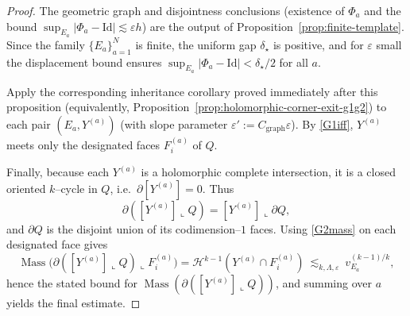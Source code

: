 \documentclass[11pt]{article}
\numberwithin{equation}{section}  %
\theoremstyle{plain}
\theoremstyle{definition}
\theoremstyle{remark}
\DeclareMathOperator{\Mass}{Mass}
\begin{document}
\begin{proof}

The geometric graph and disjointness conclusions (existence of $\Phi_a$ and the bound $\sup_{E_a}|\Phi_a-\mathrm{Id}|\lesssim \varepsilon h$)
are the output of Proposition~\ref{prop:finite-template}.
Since the family $\{E_a\}_{a=1}^N$ is finite, the uniform gap $\delta_\star$ is positive, and for $\varepsilon$ small the displacement bound
ensures $\sup_{E_a}|\Phi_a-\mathrm{Id}|<\delta_\star/2$ for all $a$.

Apply the corresponding inheritance corollary proved immediately after this proposition (equivalently, Proposition~\ref{prop:holomorphic-corner-exit-g1g2})
to each pair $(E_a,Y^{(a)})$ (with slope parameter $\varepsilon':=C_{\mathrm{graph}}\varepsilon$).
By \eqref{G1iff}, $Y^{(a)}$ meets only the designated faces $F_i^{(a)}$ of $Q$.

Finally, because each $Y^{(a)}$ is a holomorphic complete intersection, it is a closed oriented $k$--cycle in $Q$, i.e.\ $\partial[Y^{(a)}]=0$.
Thus
\[
\partial([Y^{(a)}]\llcorner Q)= [Y^{(a)}]\llcorner \partial Q,
\]
and $\partial Q$ is the disjoint union of its codimension--$1$ faces.  Using \eqref{G2mass} on each designated face gives
\[
\Mass\bigl(\partial([Y^{(a)}]\llcorner Q)\llcorner F_i^{(a)}\bigr)
=\mathcal H^{k-1}(Y^{(a)}\cap F_i^{(a)})
\ \lesssim_{k,\Lambda,\varepsilon}\ v_{E_a}^{(k-1)/k},
\]
hence the stated bound for $\Mass(\partial([Y^{(a)}]\llcorner Q))$, and summing over $a$ yields the final estimate.

\end{proof}

\begingroup
\end{document}
